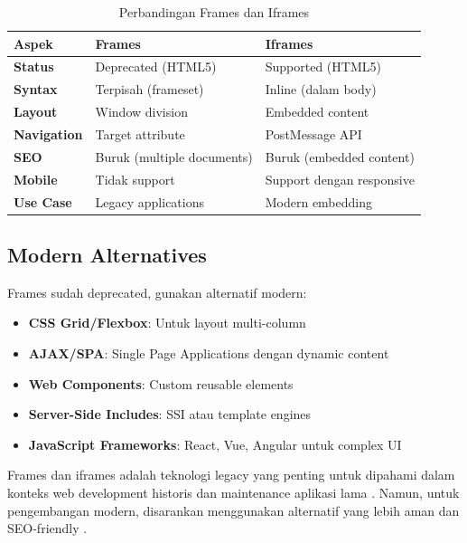 \begin{table}[h]
\centering
\small
\begin{tabular}{|l|p{6cm}|p{6cm}|}
\hline
\textbf{Aspek} & \textbf{Frames} & \textbf{Iframes} \\
\hline
\textbf{Status} & Deprecated (HTML5) & Supported (HTML5) \\
\hline
\textbf{Syntax} & Terpisah (frameset) & Inline (dalam body) \\
\hline
\textbf{Layout} & Window division & Embedded content \\
\hline
\textbf{Navigation} & Target attribute & PostMessage API \\
\hline
\textbf{SEO} & Buruk (multiple documents) & Buruk (embedded content) \\
\hline
\textbf{Mobile} & Tidak support & Support dengan responsive \\
\hline
\textbf{Use Case} & Legacy applications & Modern embedding \\
\hline
\end{tabular}
\caption{Perbandingan Frames dan Iframes}
\end{table}

\subsection{Modern Alternatives}

Frames sudah deprecated, gunakan alternatif modern:

\begin{itemize}
  \item \textbf{CSS Grid/Flexbox}: Untuk layout multi-column
  \item \textbf{AJAX/SPA}: Single Page Applications dengan dynamic content
  \item \textbf{Web Components}: Custom reusable elements
  \item \textbf{Server-Side Includes}: SSI atau template engines
  \item \textbf{JavaScript Frameworks}: React, Vue, Angular untuk complex UI
\end{itemize}

Frames dan iframes adalah teknologi legacy yang penting untuk dipahami dalam konteks web development historis dan maintenance aplikasi lama \cite{w3schools-html}. Namun, untuk pengembangan modern, disarankan menggunakan alternatif yang lebih aman dan SEO-friendly \cite{mdn-html}.
